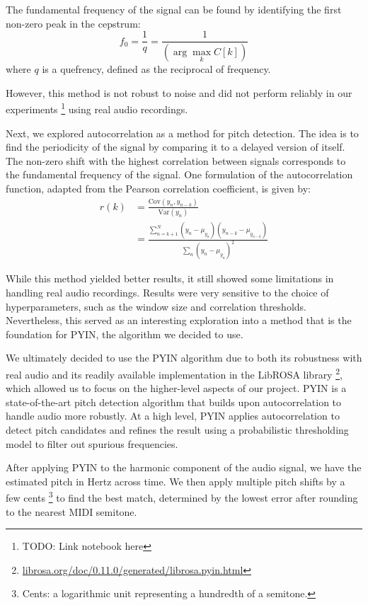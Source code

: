 The fundamental frequency of the signal can be found by identifying the first non-zero peak in the cepstrum:
$$f_0 = \frac{1}{q} = \frac{1}{\left(\arg\max_{k} C[k]\right)}$$
where $q$ is a quefrency, defined as the reciprocal of frequency.

However, this method is not robust to noise and did not perform reliably in our experiments \footnote{TODO: Link notebook here} using real audio recordings.


Next, we explored autocorrelation as a method for pitch detection. The idea is to find the periodicity of the signal by comparing it to a delayed version of itself. The non-zero shift with the highest correlation between signals corresponds to the fundamental frequency of the signal. One formulation of the autocorrelation function, adapted from the Pearson correlation coefficient, is given by:
\begin{align*}
    r(k)
    &= \frac{\text{Cov}(y_n, y_{n-k})}{\text{Var}(y_n)} \\
    &= \frac{\sum_{n=k+1}^N (y_n - \mu_{y_n}) (y_{n-k} - \mu_{y_{n-k}})}{\sum_n (y_n - \mu_{y_n})^2}
\end{align*}

While this method yielded better results, it still showed some limitations in handling real audio recordings. Results were very sensitive to the choice of hyperparameters, such as the window size and correlation thresholds. Nevertheless, this served as an interesting exploration into a method that is the foundation for PYIN, the algorithm we decided to use.


We ultimately decided to use the PYIN algorithm \autocite{PYIN:2014} due to both its robustness with real audio and its readily available implementation in the LibROSA library \footnote{\href{https://librosa.org/doc/0.11.0/generated/librosa.pyin.html}{librosa.org/doc/0.11.0/generated/librosa.pyin.html}}, which allowed us to focus on the higher-level aspects of our project. PYIN is a state-of-the-art pitch detection algorithm that builds upon autocorrelation to handle audio more robustly. At a high level, PYIN applies autocorrelation to detect pitch candidates and refines the result using a probabilistic thresholding model to filter out spurious frequencies.

After applying PYIN to the harmonic component of the audio signal, we have the estimated pitch in Hertz across time. We then apply multiple pitch shifts by a few cents \footnote{Cents: a logarithmic unit representing a hundredth of a semitone.} to find the best match, determined by the lowest error after rounding to the nearest MIDI semitone.

